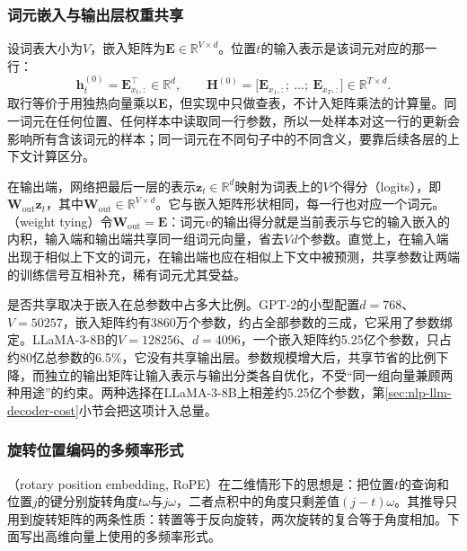\subsubsection{词元嵌入与输出层权重共享}
\label{sec:nlp-llm-embedding-tying}

设词表大小为$V$，嵌入矩阵为$\bm E\in\mathbb R^{V\times d}$。位置$t$的输入表示是该词元对应的那一行：
\[
  \bm h_t^{(0)}=\bm E_{x_t,:}^{\top}\in\mathbb R^{d},
  \qquad
  \bm H^{(0)}=\bigl[\bm E_{x_1,:};\ \ldots;\ \bm E_{x_T,:}\bigr]\in\mathbb R^{T\times d}.
\]
取行等价于用独热向量乘以$\bm E$，但实现中只做查表，不计入矩阵乘法的计算量。同一词元在任何位置、任何样本中读取同一行参数，所以一处样本对这一行的更新会影响所有含该词元的样本；同一词元在不同句子中的不同含义，要靠后续各层的上下文计算区分。

在输出端，网络把最后一层的表示$\bm z_t\in\mathbb R^d$映射为词表上的$V$个得分（logits），即$\bm W_{\mathrm{out}}\bm z_t$，其中$\bm W_{\mathrm{out}}\in\mathbb R^{V\times d}$。它与嵌入矩阵形状相同，每一行也对应一个词元。（weight tying）令$\bm W_{\mathrm{out}}=\bm E$：词元$v$的输出得分就是当前表示与它的输入嵌入的内积，输入端和输出端共享同一组词元向量，省去$Vd$个参数。直觉上，在输入端出现于相似上下文的词元，在输出端也应在相似上下文中被预测，共享参数让两端的训练信号互相补充，稀有词元尤其受益。

是否共享取决于嵌入在总参数中占多大比例。GPT-2的小型配置$d=768$、$V=50257$，嵌入矩阵约有3860万个参数，约占全部参数的三成，它采用了参数绑定。LLaMA-3-8B的$V=128256$、$d=4096$，一个嵌入矩阵约5.25亿个参数，只占约80亿总参数的6.5\%，它没有共享输出层。参数规模增大后，共享节省的比例下降，而独立的输出矩阵让输入表示与输出分类各自优化，不受“同一组向量兼顾两种用途”的约束。两种选择在LLaMA-3-8B上相差约5.25亿个参数，第\ref{sec:nlp-llm-decoder-cost}小节会把这项计入总量。

\subsubsection{旋转位置编码的多频率形式}
\label{sec:nlp-llm-rope}

（rotary position embedding, RoPE）在二维情形下的思想是：把位置$t$的查询和位置$j$的键分别旋转角度$t\omega$与$j\omega$，二者点积中的角度只剩差值$(j-t)\omega$。其推导只用到旋转矩阵的两条性质：转置等于反向旋转，两次旋转的复合等于角度相加。下面写出高维向量上使用的多频率形式。

